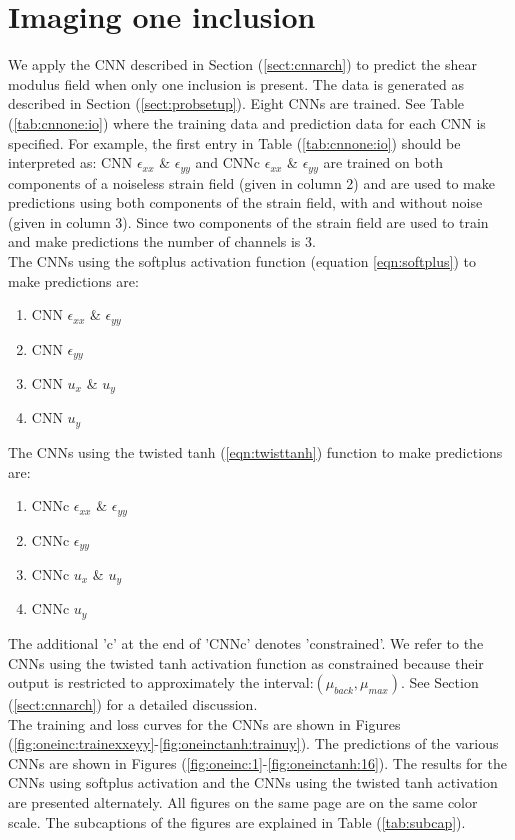\documentclass[12pt]{article}
\begin{document}
\section{\label{sect:oneinc}Imaging one inclusion}
We apply the CNN described in Section (\ref{sect:cnnarch}) to predict the shear modulus field when only one inclusion is present. The data is generated as described in Section (\ref{sect:probsetup}). Eight CNNs are trained. See Table (\ref{tab:cnnone:io}) where the training data and prediction data for each CNN is specified. For example, the first entry in Table (\ref{tab:cnnone:io}) should be interpreted as: CNN $\epsilon_{xx}$ \& $\epsilon_{yy}$ and CNNc $\epsilon_{xx}$ \& $\epsilon_{yy}$ are trained on both components of a noiseless strain field (given in column 2) and are used to make predictions using both components of the strain field, with and without noise (given in column 3). Since two components of the strain field are used to train and make predictions the number of channels is $3$.\\The CNNs using the softplus activation function (equation \ref{eqn:softplus}) to make predictions are:
\begin{enumerate}
\item{CNN $\epsilon_{xx}$ \& $\epsilon_{yy}$}
\item{CNN $\epsilon_{yy}$}
\item{CNN $u_x$ \& $u_y$}
\item{CNN $u_y$}
\end{enumerate}
The CNNs using the twisted tanh (\ref{eqn:twisttanh}) function to make predictions are:
\begin{enumerate}
\item{CNNc $\epsilon_{xx}$ \& $\epsilon_{yy}$}
\item{CNNc $\epsilon_{yy}$}
\item{CNNc $u_x$ \& $u_y$}
\item{CNNc $u_y$}
\end{enumerate}
The additional 'c' at the end of 'CNNc' denotes 'constrained'. We refer to the CNNs using the twisted tanh activation function as constrained because their output is restricted to approximately the interval:$(\mu_{back},\mu_{max})$. See Section (\ref{sect:cnnarch}) for a detailed discussion. \\
The training and loss curves for the CNNs are shown in Figures (\ref{fig:oneinc:trainexxeyy}-\ref{fig:oneinctanh:trainuy}). The predictions of the various CNNs are shown in Figures (\ref{fig:oneinc:1}-\ref{fig:oneinctanh:16}). The results for the CNNs using softplus activation and the CNNs using the twisted tanh activation are presented alternately. All figures on the same page are on the same color scale. The subcaptions of the figures are explained in Table (\ref{tab:subcap}).\\
\end{document}
